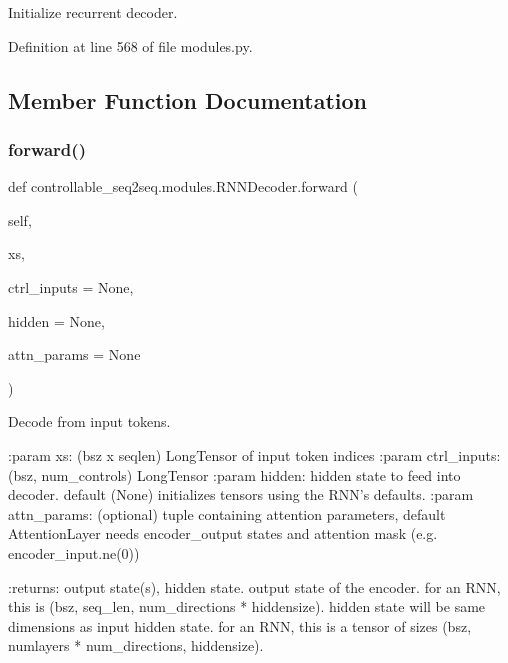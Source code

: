 \begin{DoxyVerb}Initialize recurrent decoder.\end{DoxyVerb}
 

Definition at line 568 of file modules.\+py.



\subsection{Member Function Documentation}
\mbox{\label{classcontrollable__seq2seq_1_1modules_1_1RNNDecoder_af72b9bf152e1c9fc931623af39723018}} 
\subsubsection{\texorpdfstring{forward()}{forward()}}
{\footnotesize\ttfamily def controllable\+\_\+seq2seq.\+modules.\+R\+N\+N\+Decoder.\+forward (\begin{DoxyParamCaption}\item[{}]{self,  }\item[{}]{xs,  }\item[{}]{ctrl\+\_\+inputs = {\ttfamily None},  }\item[{}]{hidden = {\ttfamily None},  }\item[{}]{attn\+\_\+params = {\ttfamily None} }\end{DoxyParamCaption})}

\begin{DoxyVerb}Decode from input tokens.

:param xs:          (bsz x seqlen) LongTensor of input token indices
:param ctrl_inputs: (bsz, num_controls) LongTensor
:param hidden:      hidden state to feed into decoder. default (None)
            initializes tensors using the RNN's defaults.
:param attn_params: (optional) tuple containing attention parameters,
            default AttentionLayer needs encoder_output states
            and attention mask (e.g. encoder_input.ne(0))

:returns:           output state(s), hidden state.
            output state of the encoder. for an RNN, this is
            (bsz, seq_len, num_directions * hiddensize).
            hidden state will be same dimensions as input
            hidden state. for an RNN, this is a tensor of sizes
            (bsz, numlayers * num_directions, hiddensize).
\end{DoxyVerb}
 


